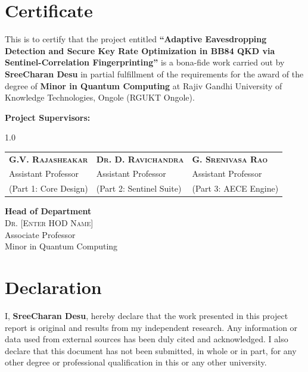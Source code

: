\documentclass[journal,onecolumn,12pt,draftclsnofoot]{IEEEtran}
\begin{document}
\section*{Certificate}
\vspace{0.3in}

This is to certify that the project entitled \textbf{``Adaptive Eavesdropping Detection and Secure Key Rate Optimization in BB84 QKD via Sentinel-Correlation Fingerprinting''} is a bona-fide work carried out by \textbf{SreeCharan Desu} in partial fulfillment of the requirements for the award of the degree of \textbf{Minor in Quantum Computing} at Rajiv Gandhi University of Knowledge Technologies, Ongole (RGUKT Ongole).

\vspace{0.5in}

\noindent \textbf{Project Supervisors:}

\begin{spacing}{1.0}
\begin{tabular}{@{}p{} p{} p{}@{}}
    \textbf{\textsc{G.V. Rajasheakar}} & \textbf{\textsc{Dr. D. Ravichandra}} & \textbf{\textsc{G. Srenivasa Rao}} \\
    Assistant Professor & Assistant Professor & Assistant Professor \\
    {\small (Part 1: Core Design)} & {\small (Part 2: Sentinel Suite)} & {\small (Part 3: AECE Engine)}
\end{tabular}
\end{spacing}

\vspace{0.8in}

\noindent \textbf{Head of Department} \\
\textsc{Dr. [Enter HOD Name]} \\
Associate Professor \\
Minor in Quantum Computing

\newpage

\section*{Declaration}
\vspace{0.5in}

I, \textbf{SreeCharan Desu}, hereby declare that the work presented in this project report is original and results from my independent research. Any information or data used from external sources has been duly cited and acknowledged. I also declare that this document has not been submitted, in whole or in part, for any other degree or professional qualification in this or any other university.
\end{document}
